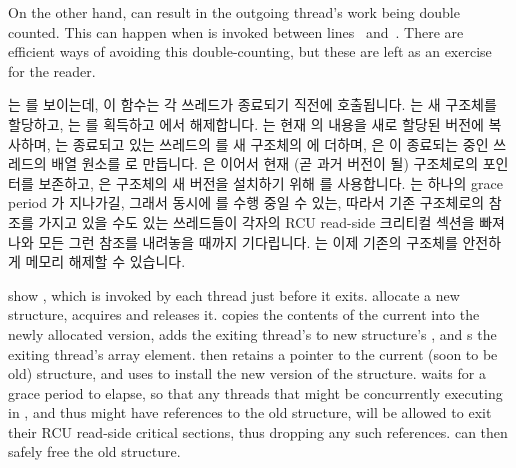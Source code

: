 {	\begin{fcvref}
	On the other hand,  can result
	in the outgoing thread's work being double counted.
	This can happen when  is invoked between
	lines~ and~.
	There are efficient ways of avoiding this double-counting, but
	these are left as an exercise for the reader.
	\end{fcvref}

	\fi

}\QuickQuizEnd

\begin{fcvref}
 는  를 보이는데, 이 함수는 각
쓰레드가 종료되기 직전에 호출됩니다.
 는 새  구조체를 할당하고,
 는  를 획득하고  에서 해제합니다.
 는 현재  의 내용을 새로 할당된 버전에 복사하며,
 는 종료되고 있는 쓰레드의  를 새 구조체의 
에 더하며,  은 이 종료되는 중인 쓰레드의  배열
원소를  로 만듭니다.
 은 이어서 현재 (곧 과거 버전이 될)  구조체로의
포인터를 보존하고,  은  구조체의 새 버전을
설치하기 위해  를 사용합니다.
 는 하나의 grace period 가 지나가길, 그래서 동시에
 를 수행 중일 수 있는, 따라서 기존  구조체로의
참조를 가지고 있을 수도 있는 쓰레드들이 각자의 RCU read-side 크리티컬 섹션을
빠져나와 모든 그런 참조를 내려놓을 때까지 기다립니다.
 는 이제 기존의  구조체를 안전하게 메모리 해제할 수
있습니다.
\end{fcvref}

\iffalse

\begin{fcvref}
 show , which is invoked
by each thread just before it exits.
 allocate a new  structure,
 acquires  and  releases it.
 copies the contents of the current  into
the newly allocated version,  adds the exiting thread's 
to new structure's , and  s the exiting thread's
 array element.
 then retains a pointer to the current (soon to be old)
 structure, and  uses 
to install the new version of the  structure.
 waits for a grace period to elapse, so that any threads that
might be concurrently executing in , and thus might
have references to the old  structure, will be allowed
to exit their RCU read-side critical sections, thus dropping any such
references.
 can then safely free the old  structure.
\end{fcvref}

